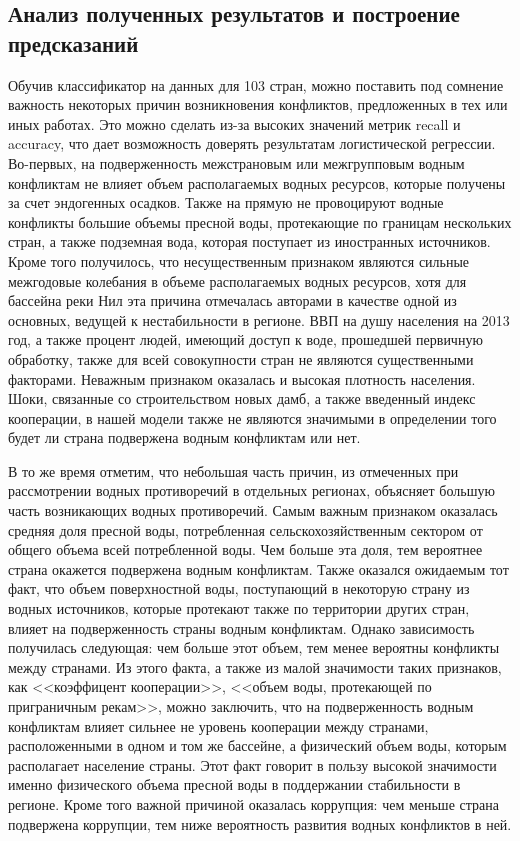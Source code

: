 \documentclass[a4paper, 12pt]{article}
\theoremstyle{plain} %
\theoremstyle{definition} %
\theoremstyle{remark} %
\begin{document}
\subsection{Анализ полученных результатов и построение предсказаний}
Обучив классификатор на данных для 103 стран, можно поставить под сомнение важность некоторых причин возникновения конфликтов, предложенных в тех или иных работах. Это можно сделать из-за высоких значений метрик recall и accuracy, что дает возможность доверять результатам логистической регрессии. Во-первых, на подверженность межстрановым или межгрупповым водным конфликтам не влияет объем располагаемых водных ресурсов, которые получены за счет эндогенных осадков. Также на прямую не провоцируют водные конфликты большие объемы пресной воды, протекающие по границам нескольких стран, а также подземная вода, которая поступает из иностранных источников. Кроме того получилось, что несущественным признаком являются сильные межгодовые колебания в объеме располагаемых водных ресурсов, хотя для бассейна реки Нил эта причина отмечалась авторами в качестве одной из основных, ведущей к нестабильности в регионе. ВВП на душу населения на 2013 год, а также процент людей, имеющий доступ к воде, прошедшей первичную обработку, также для всей совокупности стран не являются существенными факторами. Неважным признаком оказалась и высокая плотность населения. Шоки, связанные со строительством новых дамб, а также введенный индекс кооперации, в нашей модели также не являются значимыми в определении того будет ли страна подвержена водным конфликтам или нет. 

В то же время отметим, что небольшая часть причин, из отмеченных при рассмотрении водных противоречий в отдельных регионах, объясняет большую часть возникающих водных противоречий. Самым важным признаком оказалась средняя доля пресной воды, потребленная сельскохозяйственным сектором от общего объема всей потребленной воды. Чем больше эта доля, тем вероятнее страна окажется подвержена водным конфликтам. Также оказался ожидаемым тот факт, что объем поверхностной воды, поступающий в некоторую страну из водных источников, которые протекают также по территории других стран, влияет на подверженность страны водным конфликтам. Однако зависимость получилась следующая: чем больше этот объем, тем менее вероятны конфликты между странами. Из этого факта, а также из малой значимости таких признаков, как <<коэффицент кооперации>>, <<объем воды, протекающей по приграничным рекам>>, можно заключить, что на подверженность водным конфликтам влияет сильнее не уровень кооперации между странами, расположенными в одном и том же бассейне, а физический объем воды, которым располагает население страны. Этот факт говорит в пользу высокой значимости именно физического объема пресной воды в поддержании стабильности в регионе. Кроме того важной причиной оказалась коррупция: чем меньше страна подвержена коррупции, тем ниже вероятность развития водных конфликтов в ней. 
\end{document}
